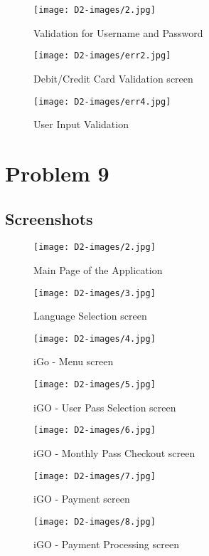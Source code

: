 \documentclass[a4paper,12pt]{report}
\newcommand{\asection}[2]{
\setcounter{section}{#1}
\addtocounter{section}{-1}
\section{#2}
}
\begin{document}
\begin{figure}[h!]
  \centering
   \texttt{[image: D2-images/2.jpg]}
  \caption{Validation for Username and Password}
\end{figure}
\begin{figure}[h!]
  \centering
   \texttt{[image: D2-images/err2.jpg]}
  \caption{Debit/Credit Card Validation screen}
\end{figure}
\begin{figure}[h!]
  \centering
   \texttt{[image: D2-images/err4.jpg]}
  \caption{User Input Validation}
\end{figure}
\chapter{Problem 9}
\asection{1}{Screenshots}
\begin{figure}[h!]
  \centering
   \texttt{[image: D2-images/2.jpg]}
  \caption{Main Page of the Application}
\end{figure}

\begin{figure}[h!]
  \centering
   \texttt{[image: D2-images/3.jpg]}
  \caption{Language Selection screen}
\end{figure}

\begin{figure}[h!]
  \centering
   \texttt{[image: D2-images/4.jpg]}
  \caption{iGo - Menu screen}
\end{figure}

\begin{figure}[h!]
  \centering
   \texttt{[image: D2-images/5.jpg]}
  \caption{iGO - User Pass Selection screen}
\end{figure}

\begin{figure}[h!]
  \centering
   \texttt{[image: D2-images/6.jpg]}
  \caption{iGO - Monthly Pass Checkout screen}
\end{figure}

\begin{figure}[h!]
  \centering
   \texttt{[image: D2-images/7.jpg]}
  \caption{iGO - Payment screen}
\end{figure}

\begin{figure}[h!]
  \centering
   \texttt{[image: D2-images/8.jpg]}
  \caption{iGO - Payment Processing screen}
\end{figure}
\end{document}
